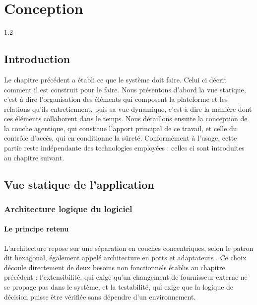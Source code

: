 \chapter{Conception}

\begin{spacing}{1.2}
\minitoc
\thispagestyle{MyStyle}
\end{spacing}
\newpage

\section*{Introduction}

Le chapitre précédent a établi ce que le système doit faire. Celui ci décrit comment il est construit pour le faire. Nous présentons d'abord la vue statique, c'est à dire l'organisation des éléments qui composent la plateforme et les relations qu'ils entretiennent, puis sa vue dynamique, c'est à dire la manière dont ces éléments collaborent dans le temps. Nous détaillons ensuite la conception de la couche agentique, qui constitue l'apport principal de ce travail, et celle du contrôle d'accès, qui en conditionne la sûreté. Conformément à l'usage, cette partie reste indépendante des technologies employées : celles ci sont introduites au chapitre suivant.

\section{Vue statique de l'application}

\subsection{Architecture logique du logiciel}

\subsubsection{Le principe retenu}

L'architecture repose sur une séparation en couches concentriques, selon le patron dit hexagonal, également appelé architecture en ports et adaptateurs \cite{cockburn, martin}. Ce choix découle directement de deux besoins non fonctionnels établis au chapitre précédent : l'extensibilité, qui exige qu'un changement de fournisseur externe ne se propage pas dans le système, et la testabilité, qui exige que la logique de décision puisse être vérifiée sans dépendre d'un environnement.

